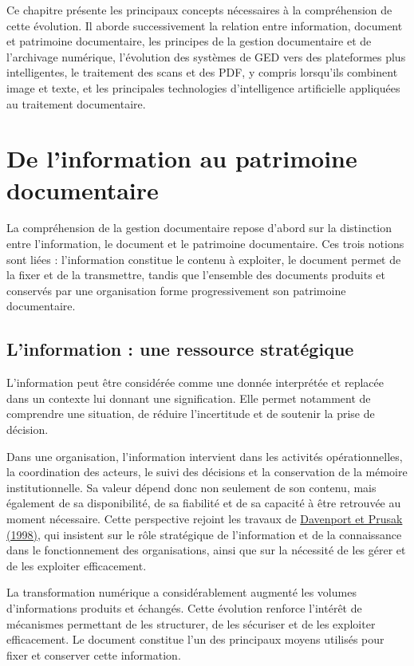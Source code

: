 \documentclass[12pt,a4paper]{report}
\newcommand{\citer}[2]{\hyperref[ref:#1]{#2}}
\begin{document}
Ce chapitre présente les principaux concepts nécessaires à la compréhension de cette évolution. Il aborde successivement la relation entre information, document et patrimoine documentaire, les principes de la gestion documentaire et de l'archivage numérique, l'évolution des systèmes de GED vers des plateformes plus intelligentes, le traitement des scans et des PDF, y compris lorsqu'ils combinent image et texte, et les principales technologies d'intelligence artificielle appliquées au traitement documentaire.

\section{De l'information au patrimoine documentaire}
La compréhension de la gestion documentaire repose d'abord sur la distinction entre l'information, le document et le patrimoine documentaire. Ces trois notions sont liées : l'information constitue le contenu à exploiter, le document permet de la fixer et de la transmettre, tandis que l'ensemble des documents produits et conservés par une organisation forme progressivement son patrimoine documentaire.

\subsection{L'information : une ressource stratégique}
L'information peut être considérée comme une donnée interprétée et replacée dans un contexte lui donnant une signification. Elle permet notamment de comprendre une situation, de réduire l'incertitude et de soutenir la prise de décision.

Dans une organisation, l'information intervient dans les activités opérationnelles, la coordination des acteurs, le suivi des décisions et la conservation de la mémoire institutionnelle. Sa valeur dépend donc non seulement de son contenu, mais également de sa disponibilité, de sa fiabilité et de sa capacité à être retrouvée au moment nécessaire. Cette perspective rejoint les travaux de \citer{davenport1998}{Davenport et Prusak (1998)}, qui insistent sur le rôle stratégique de l'information et de la connaissance dans le fonctionnement des organisations, ainsi que sur la nécessité de les gérer et de les exploiter efficacement.

La transformation numérique a considérablement augmenté les volumes d'informations produits et échangés. Cette évolution renforce l'intérêt de mécanismes permettant de les structurer, de les sécuriser et de les exploiter efficacement. Le document constitue l'un des principaux moyens utilisés pour fixer et conserver cette information.
\end{document}
